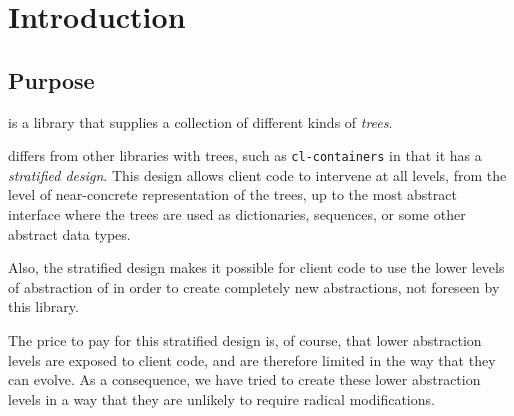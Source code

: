 \chapter{Introduction}
%

\section{Purpose}

\sysname{} is a library that supplies a collection of different kinds
of \emph{trees}.

\sysname{} differs from other libraries with trees, such as
\texttt{cl-containers} in that it has a \emph{stratified design}.
This design allows client code to intervene at all levels, from the
level of near-concrete representation of the trees, up to the most
abstract interface where the trees are used as dictionaries,
sequences, or some other abstract data types.

Also, the stratified design makes it possible for client code to use
the lower levels of abstraction of \sysname{} in order to create
completely new abstractions, not foreseen by this library.

The price to pay for this stratified design is, of course, that lower
abstraction levels are exposed to client code, and are therefore
limited in the way that they can evolve.  As a consequence, we have
tried to create these lower abstraction levels in a way that they are
unlikely to require radical modifications.
